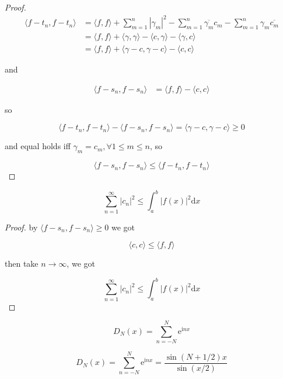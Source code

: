 \begin{proof}
    \begin{align}
        \langle f -t_n , f-t_n \rangle &= \langle f, f\rangle + \sum_{m=1}^{n} | \gamma_m| ^2 - \sum_{m=1}^{n}\overline{\gamma_m} c_m - \sum_{m=1}^{n}\gamma_m \overline{c_m} \\ 
        &= \langle f, f\rangle + \langle \gamma, \gamma \rangle - \langle c, \gamma \rangle - \langle \gamma,c \rangle \\
        &= \langle f, f\rangle + \langle \gamma -c, \gamma -c \rangle - \langle c, c \rangle
    \end{align}

    and


    \begin{align}
        \langle f -s_n , f-s_n \rangle &= \langle f, f\rangle - \langle c,c \rangle
    \end{align}

    so

    \[
\langle f -t_n , f-t_n \rangle -  \langle f -s_n , f-s_n \rangle = \langle \gamma -c , \gamma -c \rangle \ge 0
    \]

    and equal holds iff $\gamma_m = c_m, \forall 1 \le m \le n$, so

    \[
        \langle f - s_n ,f- s_n \rangle \le \langle f - t_n ,f- t_n \rangle
    \]
\end{proof}

\begin{corollary}
    \[
        \sum_{n=1}^{\infty} \left| c_n \right|^2 \le \int_a^b \left| f(x) \right|^2 \mathrm{d}x
    \] 
\end{corollary}

\begin{proof}
    by $\langle f -s_n , f-s_n \rangle \ge 0$ we got 

    \[
        \langle c, c \rangle \le \langle f, f \rangle
    \]

    then take $n \to \infty$, we got

    \[
        \sum_{n=1}^{\infty} \left| c_n \right|^2 \le  \int_a^b \left| f(x)\right|^2 \mathrm{d}x
    \]
\end{proof}

\begin{definition}
    \[
        D_N(x) = \sum_{n=-N}^{N} \mathrm{e}^{\mathrm{i} n x}
    \]
\end{definition}

\begin{thm}
    \[
        D_N(x) = \sum_{n=-N}^{N} \mathrm{e}^{\mathrm{i} n x} = \frac{\sin (N + 1/2)x}{\sin (x/2)}
    \]
\end{thm}


